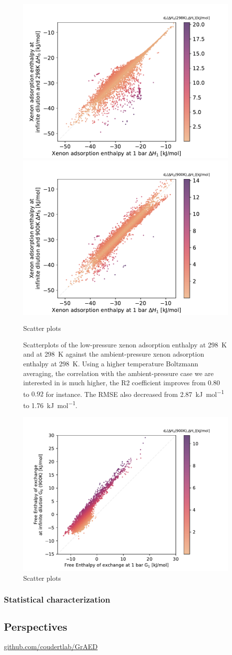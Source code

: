 \documentclass[main]{subfiles}
\begin{document}
\begin{figure}[ht]
\centering
  \includegraphics[width=0.48\linewidth]{figures/4-ml/SI_figure/Scatterplot_H1_H0.pdf}
  \includegraphics[width=0.48\linewidth]{figures/4-ml/SI_figure/Scatterplot_H1_H900K.pdf}
  \caption{Scatter plots }
  \label{fgr:H_900K}
  \caption{Scatterplots of the low-pressure xenon adsorption enthalpy at \SI{298}{\kelvin} and at \SI{298}{\kelvin} against the ambient-pressure xenon adsorption enthalpy at \SI{298}{\kelvin}. Using a higher temperature Boltzmann averaging, the correlation with the ambient-pressure case we are interested in is much higher, the R2 coefficient improves from $0.80$ to $0.92$ for instance. The RMSE also decreased from \SI{2.87}{\kilo\joule\per\mole} to \SI{1.76}{\kilo\joule\per\mole}. }
\end{figure}

\begin{figure}[ht]
\centering
  \includegraphics[width=0.70\linewidth]{figures/4-ml/SI_figure/Scatterplot_G1_G900K.pdf}
  \caption{Scatter plots }
  \label{fgr:G_900K}
\end{figure}

\subsubsection{Statistical characterization}



\subsection{Perspectives}

\url{github.com/coudertlab/GrAED}


\OnlyInSubfile{\printglobalbibliography}
\end{document}
